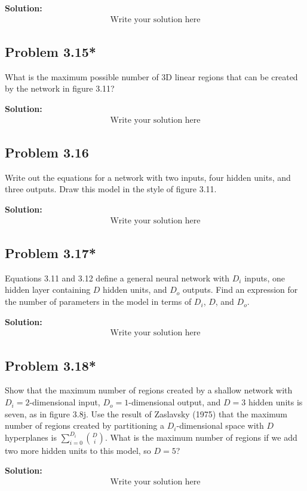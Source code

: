 \documentclass{article}
\begin{document}
        \vspace{1cm}
        \textbf{Solution:}
        \begin{align*}
            \text{Write your solution here}
        \end{align*}

    \subsection*{Problem 3.15*}
    What is the maximum possible number of 3D linear regions that can be created by the network in figure 3.11?

        \vspace{1cm}
        \textbf{Solution:}
        \begin{align*}
            \text{Write your solution here}
        \end{align*}

    \subsection*{Problem 3.16}
    Write out the equations for a network with two inputs, four hidden units, and three outputs. Draw this model in the style of figure 3.11.

        \vspace{1cm}
        \textbf{Solution:}
        \begin{align*}
            \text{Write your solution here}
        \end{align*}

    \subsection*{Problem 3.17*}
    Equations 3.11 and 3.12 define a general neural network with $D_i$ inputs, one hidden layer containing $D$ hidden units, and $D_o$ outputs. Find an expression for the number of parameters in the model in terms of $D_i$, $D$, and $D_o$.

        \vspace{1cm}
        \textbf{Solution:}
        \begin{align*}
            \text{Write your solution here}
        \end{align*}

    \subsection*{Problem 3.18*}
    Show that the maximum number of regions created by a shallow network with $D_i = 2$-dimensional input, $D_o = 1$-dimensional output, and $D = 3$ hidden units is seven, as in figure 3.8j. Use the result of Zaslavsky (1975) that the maximum number of regions created by partitioning a $D_i$-dimensional space with $D$ hyperplanes is $\sum_{i=0}^{D_i} \binom{D}{i}$. What is the maximum number of regions if we add two more hidden units to this model, so $D = 5$?

        \vspace{1cm}
        \textbf{Solution:}
        \begin{align*}
            \text{Write your solution here}
        \end{align*}
\end{document}
